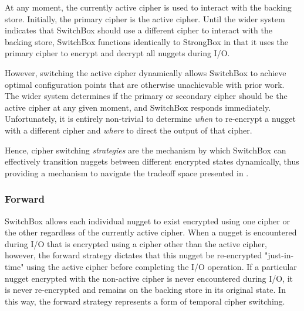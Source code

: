 At any moment, the currently active cipher is used to interact with the backing
store. Initially, the primary cipher is the active cipher. Until the wider
system indicates that SwitchBox should use a different cipher to interact with
the backing store, SwitchBox functions identically to StrongBox in that it uses
the primary cipher to encrypt and decrypt all nuggets during I/O.

However, switching the active cipher dynamically allows SwitchBox to achieve
optimal configuration points that are otherwise unachievable with prior work.
The wider system determines if the primary or secondary cipher should be the
active cipher at any given moment, and SwitchBox responds immediately.
Unfortunately, it is entirely non-trivial to determine \emph{when} to re-encrypt
a nugget with a different cipher and \emph{where} to direct the output of that
cipher. 

Hence, cipher switching \emph{strategies} are the mechanism by which SwitchBox
can effectively transition nuggets between different encrypted states
dynamically, thus providing a mechanism to navigate the tradeoff space presented
in .  

\subsubsection{Forward}

SwitchBox allows each individual nugget to exist encrypted using one cipher or
the other regardless of the currently active cipher. When a nugget is
encountered during I/O that is encrypted using a cipher other than the active
cipher, however, the forward strategy dictates that this nugget be re-encrypted
"just-in-time" using the active cipher before completing the I/O operation. If a
particular nugget encrypted with the non-active cipher is never encountered
during I/O, it is never re-encrypted and remains on the backing store in its
original state. In this way, the forward strategy represents a form of temporal
cipher switching.

